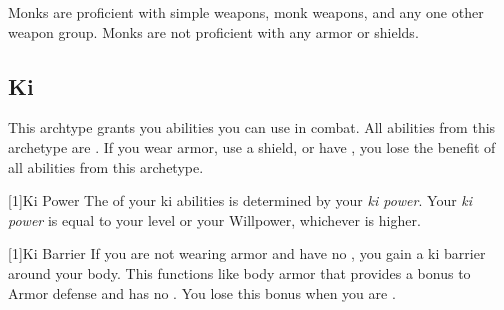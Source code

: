         Monks are proficient with simple weapons, monk weapons, and any one other weapon group.
        Monks are not proficient with any armor or shields.

    \subsection{Ki}
        This archtype grants you abilities you can use in combat.
        All abilities from this archetype are .
        If you wear armor, use a shield, or have , you lose the benefit of all abilities from this archetype.

        [1]{Ki Power}
        The  of your ki abilities is determined by your \textit{ki power}.
        Your \textit{ki power} is equal to your level or your Willpower, whichever is higher.

        [1]{Ki Barrier}
        If you are not wearing armor and have no , you gain a ki barrier around your body.
        This functions like body armor that provides a  bonus to Armor defense and has no .
        You lose this bonus when you are \helpless.

